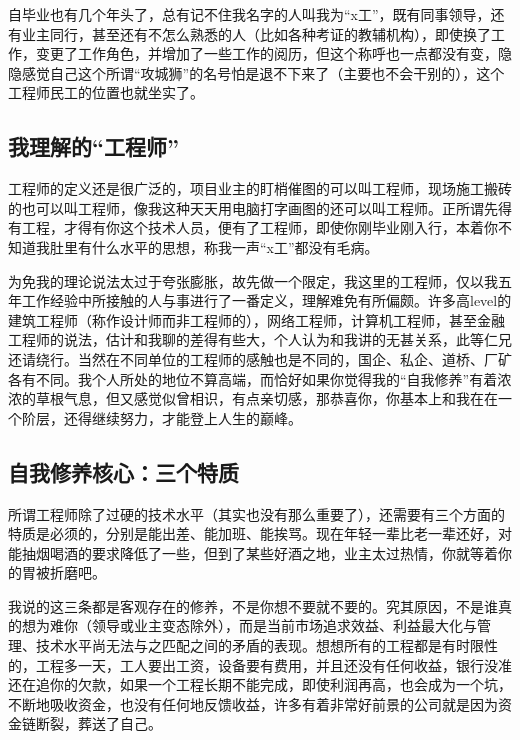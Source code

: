 \documentclass[
]{book}
\begin{document}
自毕业也有几个年头了，总有记不住我名字的人叫我为``x工''，既有同事领导，还有业主同行，甚至还有不怎么熟悉的人（比如各种考证的教辅机构），即使换了工作，变更了工作角色，并增加了一些工作的阅历，但这个称呼也一点都没有变，隐隐感觉自己这个所谓``攻城狮''的名号怕是退不下来了（主要也不会干别的），这个工程师民工的位置也就坐实了。

\hypertarget{ux6211ux7406ux89e3ux7684ux5de5ux7a0bux5e08}{%
\subsection{我理解的``工程师''}\label{ux6211ux7406ux89e3ux7684ux5de5ux7a0bux5e08}}

工程师的定义还是很广泛的，项目业主的盯梢催图的可以叫工程师，现场施工搬砖的也可以叫工程师，像我这种天天用电脑打字画图的还可以叫工程师。正所谓先得有工程，才得有你这个技术人员，便有了工程师，即使你刚毕业刚入行，本着你不知道我肚里有什么水平的思想，称我一声``x工''都没有毛病。

为免我的理论说法太过于夸张膨胀，故先做一个限定，我这里的工程师，仅以我五年工作经验中所接触的人与事进行了一番定义，理解难免有所偏颇。许多高level的建筑工程师（称作设计师而非工程师的），网络工程师，计算机工程师，甚至金融工程师的说法，估计和我聊的差得有些大，个人认为和我讲的无甚关系，此等仁兄还请绕行。当然在不同单位的工程师的感触也是不同的，国企、私企、道桥、厂矿各有不同。我个人所处的地位不算高端，而恰好如果你觉得我的``自我修养''有着浓浓的草根气息，但又感觉似曾相识，有点亲切感，那恭喜你，你基本上和我在在一个阶层，还得继续努力，才能登上人生的巅峰。

\hypertarget{ux81eaux6211ux4feeux517bux6838ux5fc3ux4e09ux4e2aux7279ux8d28}{%
\subsection{自我修养核心：三个特质}\label{ux81eaux6211ux4feeux517bux6838ux5fc3ux4e09ux4e2aux7279ux8d28}}

所谓工程师除了过硬的技术水平（其实也没有那么重要了），还需要有三个方面的特质是必须的，分别是能出差、能加班、能挨骂。现在年轻一辈比老一辈还好，对能抽烟喝酒的要求降低了一些，但到了某些好酒之地，业主太过热情，你就等着你的胃被折磨吧。

我说的这三条都是客观存在的修养，不是你想不要就不要的。究其原因，不是谁真的想为难你（领导或业主变态除外），而是当前市场追求效益、利益最大化与管理、技术水平尚无法与之匹配之间的矛盾的表现。想想所有的工程都是有时限性的，工程多一天，工人要出工资，设备要有费用，并且还没有任何收益，银行没准还在追你的欠款，如果一个工程长期不能完成，即使利润再高，也会成为一个坑，不断地吸收资金，也没有任何地反馈收益，许多有着非常好前景的公司就是因为资金链断裂，葬送了自己。
\end{document}
